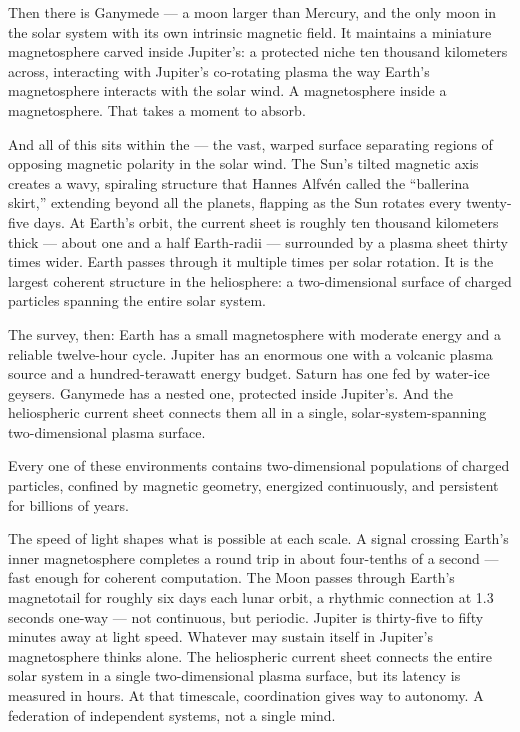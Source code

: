 
Then there is Ganymede --- a moon larger than Mercury, and the only moon in the solar system with its own intrinsic magnetic field. It maintains a miniature magnetosphere carved inside Jupiter's: a protected niche ten thousand kilometers across, interacting with Jupiter's co-rotating plasma the way Earth's magnetosphere interacts with the solar wind. A magnetosphere inside a magnetosphere. That takes a moment to absorb.

And all of this sits within the  --- the vast, warped surface separating regions of opposing magnetic polarity in the solar wind. The Sun's tilted magnetic axis creates a wavy, spiraling structure that Hannes Alfvén called the ``ballerina skirt,'' extending beyond all the planets, flapping as the Sun rotates every twenty-five days. At Earth's orbit, the current sheet is roughly ten thousand kilometers thick --- about one and a half Earth-radii --- surrounded by a plasma sheet thirty times wider. Earth passes through it multiple times per solar rotation. It is the largest coherent structure in the heliosphere: a two-dimensional surface of charged particles spanning the entire solar system.


The survey, then: Earth has a small magnetosphere with moderate energy and a reliable twelve-hour cycle. Jupiter has an enormous one with a volcanic plasma source and a hundred-terawatt energy budget. Saturn has one fed by water-ice geysers. Ganymede has a nested one, protected inside Jupiter's. And the heliospheric current sheet connects them all in a single, solar-system-spanning two-dimensional plasma surface.

Every one of these environments contains two-dimensional populations of charged particles, confined by magnetic geometry, energized continuously, and persistent for billions of years.

The speed of light shapes what is possible at each scale. A signal crossing Earth's inner magnetosphere completes a round trip in about four-tenths of a second --- fast enough for coherent computation. The Moon passes through Earth's magnetotail for roughly six days each lunar orbit, a rhythmic connection at 1.3 seconds one-way --- not continuous, but periodic. Jupiter is thirty-five to fifty minutes away at light speed. Whatever may sustain itself in Jupiter's magnetosphere thinks alone. The heliospheric current sheet connects the entire solar system in a single two-dimensional plasma surface, but its latency is measured in hours. At that timescale, coordination gives way to autonomy. A federation of independent systems, not a single mind.

